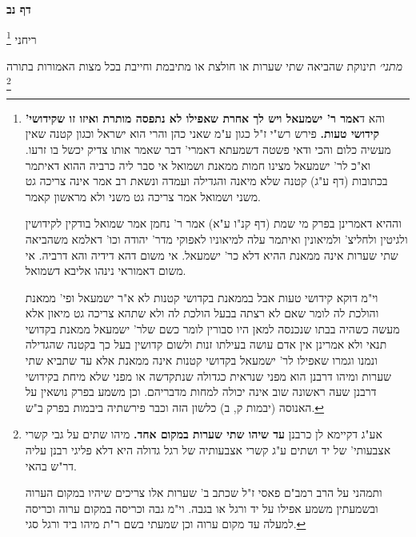 \documentclass[12pt, openany]{book}
\newcommand{\sethebfont}{
\fontsize{10.5pt}{21.0pt} \selectfont
}
\newcommand{\twocol}[1]{
	{\sethebfont \begin{multicols}{2}
			#1
	\end{multicols}}	
}
\newcommand{\sectname}{}
\newcommand{\newsection}[1]{
	\addcontentsline{toc}{section}{#1}
	\renewcommand{\sectname}{#1}	
	\vspace{-\baselineskip}
	\begin{center}
		\textbf{%
\fontsize{16pt}{16pt}\selectfont
			#1}
	\end{center}
	\vspace{-\baselineskip}
	\nopagebreak
}
\newcommand{\footnotecomment}[1]{\footnote{#1}}
\newcommand{\commenta}[1]{\footnotecomment{#1}}
\begin{document}
\newsection{דף נב}
\twocol{ריחני
\commenta{והא ד\textbf{אמר ר' ישמעאל ויש לך אחרת שאפילו לא נתפסה מותרת ואיזו זו שקידושי' קידושי טעות.}  פירש רש"י ז"ל כגון ע"מ שאני כהן והרי הוא ישראל וכגון קטנה שאין מעשיה כלום והכי ודאי פשטה דשמעתא דאמרי' דבר שאמר אותו צדיק יכשל בו זרעו. וא"כ לר' ישמעאל מצינו חמות ממאנת ושמואל אי סבר ליה כרביה ההוא דאיתמר בכתובות (דף ע"ג) קטנה שלא מיאנה והגדילה ועמדה ונשאת רב אמר אינה צריכה גט משני ושמואל אמר צריכה גט משני ולא מראשון קאמר.\par  וההיא דאמרינן בפרק מי שמת (דף קנ"ו ע"א) אמר ר' נחמן אמר שמואל בודקין לקידושין ולגיטין ולחליצ' ולמיאונין ואיתמר עלה למיאוניו לאפוקי מדר' יהודה וכו' דאלמא משהביאה שתי שערות אינה ממאנת ההיא דלא כר' ישמעאל. אי משום דהא דידיה והא דרביה. אי משום דאמוראי נינהו אליבא דשמואל.\par וי"מ דוקא קידושי טעות אבל בממאנת בקדושי קטנות לא א"ר ישמעאל ופי' ממאנת והולכת לה לומר שאם לא רצתה בבעל הולכת לה ולא שתהא צריכה גט מיאון אלא מעשה כשהיה בבתו שנכנסה למאן היו סבורין לומר כשם שלר' ישמעאל ממאנת בקדושי תנאי ולא אמרינן אין אדם עושה בעילתו זנות ולשום קדושין בעל כך בקטנה שהגדילה ונמנו וגמרו שאפילו לר' ישמעאל בקדושי קטנות אינה ממאנת אלא עד שתביא שתי שערות ומיהו דרבנן הוא מפני שנראית כגדולה שנתקדשה או מפני שלא מיחת בקידושי דרבנן שעה ראשונה שוב אינה יכולה למחות מדבריהם. וכן משמע בפרק נושאין על האנוסה (יבמות ק, ב) כלשון הזה וכבר פירשתיה ביבמות בפרק ב"ש. }

{\large\emph{מתני׳}} תינוקת שהביאה שתי שערות או חולצת או מתיבמת וחייבת בכל מצות האמורות בתורה
\commenta{אע"ג דקיימא לן כרבנן \textbf{עד שיהו שתי שערות במקום אחד.}  מיהו שתים על גבי קשרי אצבעותי' של יד ושתים ע"ג קשרי אצבעותיה של רגל גדולה היא דלא פליגי רבנן עליה דר"ש בהאי.\par ותמהני על הרב רמב"ם פאסי ז"ל שכתב ב' שערות אלו צריכים שיהיו במקום הערוה ובשמעתין משמע אפילו על יד ורגל או בגבה. וי"מ גבה וכריסה במקום ערוה וכריסה למעלה עד מקום ערוה וכן שמעתי בשם ר"ת מיהו ביד ורגל סגי. }

}
\end{document}
